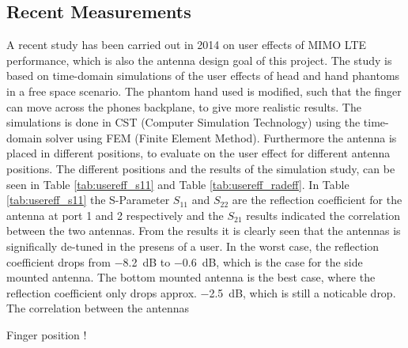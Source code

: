 \subsection{Recent Measurements}
A recent study has been carried out in 2014 on user effects of MIMO LTE performance, which is also the antenna design goal of this project. The study is based on time-domain simulations of the user effects of head and hand phantoms in a free space scenario. The phantom hand used is modified, such that the finger can move across the phones backplane, to give more realistic results. The simulations is done in CST (Computer Simulation Technology) using the time-domain solver using FEM (Finite Element Method). Furthermore the antenna is placed in different positions, to evaluate on the user effect for different antenna positions. The different positions and the results of the simulation study, can be seen in Table \ref{tab:usereff_s11} and Table \ref{tab:usereff_radeff}. In Table \ref{tab:usereff_s11} the S-Parameter $S_{11}$ and $S_{22}$ are the reflection coefficient for the antenna at port 1 and 2 respectively and the $S_{21}$ results indicated the correlation between the two antennas. From the results it is clearly seen that the antennas is significally de-tuned in the presens of a user. In the worst case, the reflection coefficient drops from \SI{-8.2}{dB} to \SI{-0.6}{dB}, which is the case for the side mounted antenna. The bottom mounted antenna is the best case, where the reflection coefficient only drops approx. \SI{-2.5}{dB}, which is still a noticable drop. The correlation between the antennas

Finger position !    

